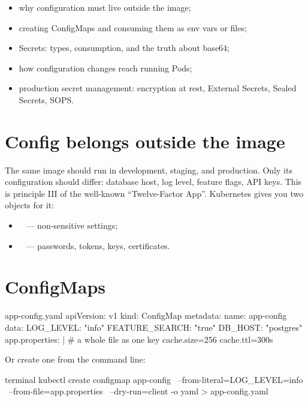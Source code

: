 
\begin{objectives}
\begin{itemize}
  \item why configuration must live outside the image;
  \item creating ConfigMaps and consuming them as env vars or files;
  \item Secrets: types, consumption, and the truth about base64;
  \item how configuration changes reach running Pods;
  \item production secret management: encryption at rest, External Secrets,
        Sealed Secrets, SOPS.
\end{itemize}
\end{objectives}

\section{Config belongs outside the image}

The same image should run in development, staging, and production. Only its
configuration should differ: database host, log level, feature flags, API keys.
This is principle III of the well-known ``Twelve-Factor App''. Kubernetes gives
you two objects for it:

\begin{itemize}
  \item {}~ --- non-sensitive settings;
  \item {}~ --- passwords, tokens, keys, certificates.
\end{itemize}

\section{ConfigMaps}

\begin{yamlcode}{app-config.yaml}
apiVersion: v1
kind: ConfigMap
metadata:
  name: app-config
data:
  LOG_LEVEL: "info"
  FEATURE_SEARCH: "true"
  DB_HOST: "postgres"
  app.properties: |              # a whole file as one key
    cache.size=256
    cache.ttl=300s
\end{yamlcode}

Or create one from the command line:

\begin{bashcode}{terminal}
kubectl create configmap app-config \
  --from-literal=LOG_LEVEL=info \
  --from-file=app.properties \
  --dry-run=client -o yaml > app-config.yaml
\end{bashcode}

